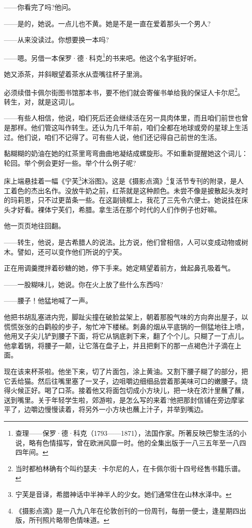 \par ——你看完了吗?他问。
\par ——是的，她说。一点儿也不黄。她是不是一直在爱着那头一个男人?
\par ——从来没读过。你想要换一本吗?
\par ——嗯。另借一本保罗·德·科克\footnote{查理——保罗·德·科克（1793——1871），法国作家。所著反映巴黎生活的小说，略有色情描写，曾在欧洲风靡一时。他的全集出版于一八三五年至一八四四年间。}的书来吧。他这个名字挺好听。
\par 她又添茶，并斜眼望着茶水从壶嘴往杯子里淌。
\par 必须续借卡佩尔街图书馆那本书，要不他们就会寄催书单给我的保证人卡尔尼\footnote{当时都柏林确有个叫约瑟夫·卡尔尼的人，在卡佩尔街十四号经售书籍乐谱。}。转生，对，就是这词儿。
\par ——有些人相信，他说，咱们死后还会继续活在另一具肉体里，而且咱们前世也曾是那样。他们管这叫作转生。还认为几千年前，咱们全都在地球或旁的星球上生活过。他们说，咱们不记得了。可有些人说，他们还记得自己前世的生活。
\par 黏糊糊的奶油在她的红茶里弯弯曲曲地凝结成螺旋形。不如重新提醒她这个词儿：轮回。举个例会更好一些。举个什么例子呢?
\par 床上端悬挂着一幅《宁芙\footnote{宁芙是音译，希腊神话中半神半人的少女。她们通常住在山林水泽中。}沐浴图》。这是《摄影点滴》\footnote{《摄影点滴》是一八九八年在伦敦创刊的一份周刊，每册一便士，逢星期四出版，所刊照片略带色情味道。}复活节专刊的附录，是人工着色的杰出名作。没放牛奶之前，红茶就是这种颜色。未尝不像是披散起头发时的玛莉恩，只不过更苗条一些。在这副镜框上，我花了三先令六便士。她说挂在床头才好看。裸体宁芙们，希腊。拿生活在那个时代的人们作例子也好嘛。
\par 他一页页地往回翻。
\par ——转生，他说，是古希腊人的说法。比方说，他们曾相信，人可以变成动物或树木。譬如，还可以变作他们所说的宁芙。
\par 正在用调羹搅拌着砂糖的她，停下手来。她定睛望着前方，耸起鼻孔吸着气。
\par ——一股糊味儿，她说。你在火上放了些什么东西吗?
\par ——腰子！他猛地喊了一声。
\par 他把书胡乱塞进内兜，脚趾尖撞在破脸盆架上，朝着那股气味的方向奔出屋子，以慌慌张张的白鹳般的步子，匆忙冲下楼梯。刺鼻的烟从平底锅的一侧猛地往上喷，他用叉子尖儿铲到腰子下面，将它从锅底剥下来，翻了个个儿。只糊了一丁点儿。他拿着锅，将腰子一颠，让它落在盘子上，并且把剩下的那一点褐色汁子滴在上面。
\par 现在该来杯茶啦。他坐下来，切了片面包，涂上黄油。又割下腰子糊了的部分，把它丢给猫。然后往嘴里塞了一叉子，边咀嚼边细细品尝着那美味可口的嫩腰子。烧得火候正好。喝了口茶。接着他又将面包切成小方块儿，把一块在浓汁里蘸了蘸，送到嘴里。关于年轻学生啦，郊游啦，是怎么写的来着?他把那封信铺在旁边摩挲平了，边嚼边慢慢读着，将另外一小方块也蘸上汁子，并举到嘴边。
